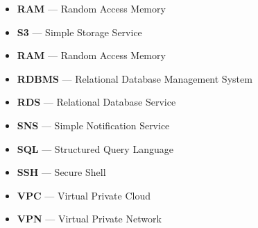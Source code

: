 \begin{itemize}
    \item  \textbf{RAM} — Random Access Memory
    \item  \textbf{S3} — Simple Storage Service
    \item  \textbf{RAM} — Random Access Memory
    \item  \textbf{RDBMS} — Relational Database Management System
    \item  \textbf{RDS} — Relational Database Service
    \item  \textbf{SNS} — Simple Notification Service
    \item  \textbf{SQL} — Structured Query Language
    \item  \textbf{SSH} — Secure Shell
    \item  \textbf{VPC} — Virtual Private Cloud
    \item  \textbf{VPN} — Virtual Private Network
\end{itemize}